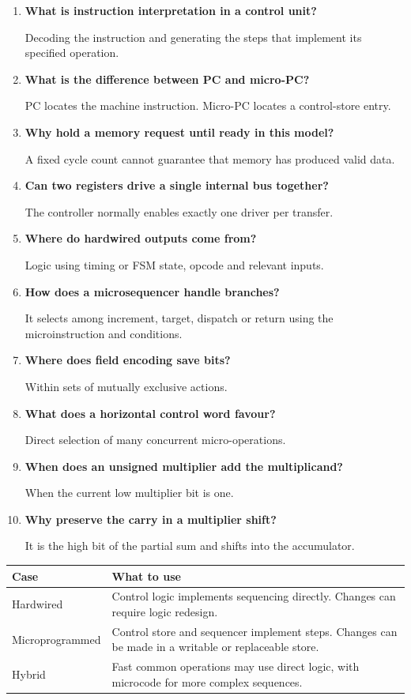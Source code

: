 \documentclass[12pt,a4paper]{article}
\newcommand{\Q}[1]{\textbf{#1}\par\noindent\ignorespaces}
\begin{document}
\begin{tcolorbox}[exambox,title={Frequently Asked / Viva Questions}]
\begin{enumerate}[topsep=0pt, label=\textbf{Q\arabic*.}, itemsep=5pt]
\item \Q{What is instruction interpretation in a control unit?}
Decoding the instruction and generating the steps that implement its specified operation.
\item \Q{What is the difference between PC and micro-PC?}
PC locates the machine instruction. Micro-PC locates a control-store entry.
\item \Q{Why hold a memory request until ready in this model?}
A fixed cycle count cannot guarantee that memory has produced valid data.
\item \Q{Can two registers drive a single internal bus together?}
The controller normally enables exactly one driver per transfer.
\item \Q{Where do hardwired outputs come from?}
Logic using timing or FSM state, opcode and relevant inputs.
\item \Q{How does a microsequencer handle branches?}
It selects among increment, target, dispatch or return using the microinstruction and conditions.
\item \Q{Where does field encoding save bits?}
Within sets of mutually exclusive actions.
\item \Q{What does a horizontal control word favour?}
Direct selection of many concurrent micro-operations.
\item \Q{When does an unsigned multiplier add the multiplicand?}
When the current low multiplier bit is one.
\item \Q{Why preserve the carry in a multiplier shift?}
It is the high bit of the partial sum and shifts into the accumulator.
\end{enumerate}
\end{tcolorbox}
\begin{tcolorbox}[tikzbox,title={Summary comparison}]
\begin{tabularx}{\linewidth}{|B{4cm}|Y|}\hline
\textbf{Case} & \textbf{What to use} \\ \hline
Hardwired & Control logic implements sequencing directly. Changes can require logic redesign. \\ \hline
Microprogrammed & Control store and sequencer implement steps. Changes can be made in a writable or replaceable store. \\ \hline
Hybrid & Fast common operations may use direct logic, with microcode for more complex sequences. \\ \hline
\end{tabularx}
\end{tcolorbox}
\end{document}
